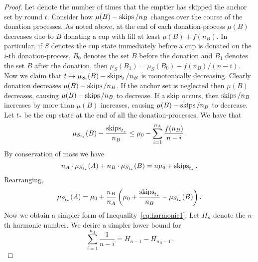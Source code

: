 \begin{proof}
  Let  denote the number of times that the
  emptier has skipped the anchor set by round $t$. Consider how
  $\mu(B) - \operatorname{\text{\textup{skips}}}/n_B$ changes over the course of the donation
  processes. As noted above, at the end of each donation-process
  $\mu(B)$ decreases due to $B$ donating a cup with fill at least
  $\mu(B) + f(n_B)$. In particular, if $S$ denotes the cup state
  immediately before a cup is donated on the $i$-th
  donation-process, $B_0$ denotes the set $B$ before
  the donation and $B_1$ denotes the set $B$ after the donation,
  then $\mu_{S}(B_1) = \mu_{S}(B_0) - f(n_B) / (n-i)$. Now we claim that
  $t\mapsto \mu_{S_t}(B) - \operatorname{\text{\textup{skips}}}_t/n_B$ is monotonically decreasing. 
  Clearly donation decreases $\mu(B) - \operatorname{\text{\textup{skips}}}/n_B$. 
  If the anchor set is neglected then $\mu(B)$ decreases, causing
  $\mu(B) - \operatorname{\text{\textup{skips}}}/n_B$ to decrease. 
  If a skip occurs, then $\operatorname{\text{\textup{skips}}}/n_B$ increases by more than
  $\mu(B)$ increases, causing $\mu(B)-\operatorname{\text{\textup{skips}}}/n_B$ to decrease. 
  Let $t_*$ be the cup state at the end of all the
  donation-processes. We have that 
  \begin{equation}
    \label{eq:harmonic1}
    \mu_{S_{t_*}}(B) - \frac{\operatorname{\text{\textup{skips}}}_{t_*}}{n_B} \le \mu_0 - \sum_{i=1}^{n_A}\frac{f(n_B)}{n-i}.
  \end{equation}
  By conservation of mass we have 
  $$n_A\cdot \mu_{S_{t_*}}(A) + n_B\cdot \mu_{S_{t_*}}(B) = n\mu_0 + \operatorname{\text{\textup{skips}}}_{t_*}.$$
  Rearranging, 
  \begin{equation}
    \label{eq:lowerboundingAharmonic}
    \mu_{S_{t_*}}(A) = \mu_0 + \frac{n_B}{n_A}\left( \mu_0 +
    \frac{\operatorname{\text{\textup{skips}}}_{t_*}}{n_B} - \mu_{S_{t_*}}(B) \right).
  \end{equation}
  Now we obtain a simpler form of
  Inequality~\eqref{eq:harmonic1}. Let $H_n$ denote the $n$-th
  harmonic
  number. We desire a simpler lower bound for 
  $$\sum_{i=1}^{n_A} \frac{1}{n-i} = H_{n-1}-H_{n_B-1}.$$


\end{proof}
